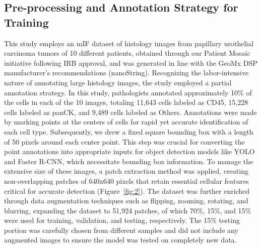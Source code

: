 \documentclass{midl} %
\begin{document}
\subsection{Pre-processing and Annotation Strategy for Training}
This study employs an mIF dataset of histology images from papillary urothelial carcinoma tumors of 10 different patients, obtained through our Patient Mosaic initiative following IRB approval, and was generated in line with the GeoMx DSP manufacturer's recommendations (nanoString). Recognizing the labor-intensive nature of annotating large histology images, the study employed a partial annotation strategy. In this study, pathologists annotated approximately 10\% of the cells in each of the 10 images, totaling 11,643 cells labeled as CD45, 15,228 cells labeled as panCK, and 9,489 cells labeled as Others. Annotations were made by marking points at the centers of cells for rapid yet accurate identification of each cell type. Subsequently, we drew a fixed square bounding box with a length of 50 pixels around each center point. This step was crucial for converting the point annotations into appropriate inputs for object detection models like YOLO and Faster R-CNN, which necessitate bounding box information. To manage the extensive size of these images, a patch extraction method was applied, creating non-overlapping patches of 640x640 pixels that retain essential cellular features critical for accurate detection (Figure~\ref{fig:2}). The dataset was further enriched through data augmentation techniques such as flipping, zooming, rotating, and blurring, expanding the dataset to 51,924 patches, of which 70\%, 15\%, and 15\% were used for training, validation, and testing, respectively. The 15\% testing portion was carefully chosen from different samples and did not include any augmented images to ensure the model was tested on completely new data.
\end{document}
